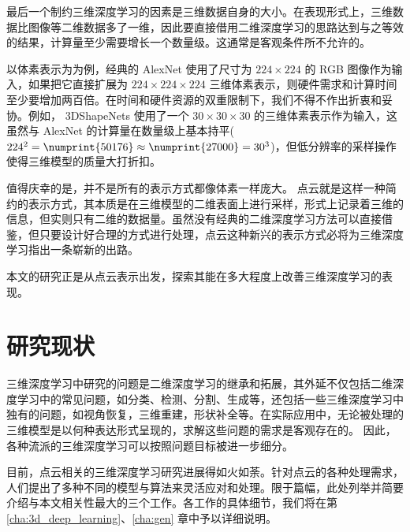 最后一个制约三维深度学习的因素是三维数据自身的大小。在表现形式上，三维数据比图像等二维数据多了一维，因此要直接借用二维深度学习的思路达到与之等效的结果，计算量至少需要增长一个数量级。这通常是客观条件所不允许的。

以体素表示为为例，经典的 AlexNet\cite{alexnet} 使用了尺寸为 $224 \times 224$ 的 RGB 图像作为输入，如果把它直接扩展为 $224 \times 224 \times 224$ 三维体素表示，则硬件需求和计算时间至少要增加两百倍。在时间和硬件资源的双重限制下，我们不得不作出折衷和妥协。例如， 3DShapeNets\cite{3dcnn} 使用了一个 $30 \times 30 \times 30$ 的三维体素表示作为输入，这虽然与 AlexNet 的计算量在数量级上基本持平($224^2 = \numprint{50176} \approx \numprint{27000} = 30^3$)，但低分辨率的采样操作使得三维模型的质量大打折扣。

值得庆幸的是，并不是所有的表示方式都像体素一样庞大。
点云就是这样一种简约的表示方式，其本质是在三维模型的二维表面上进行采样，形式上记录着三维的信息，但实则只有二维的数据量。虽然没有经典的二维深度学习方法可以直接借鉴，但只要设计好合理的方式进行处理，点云这种新兴的表示方式必将为三维深度学习指出一条崭新的出路。

本文的研究正是从点云表示出发，探索其能在多大程度上改善三维深度学习的表现。




\section{研究现状}

三维深度学习中研究的问题是二维深度学习的继承和拓展，其外延不仅包括二维深度学习中的常见问题，如分类\cite{pointnet}、检测\cite{frustumpointnet}、分割\cite{pointnet}、生成\cite{latentpc}等，还包括一些三维深度学习中独有的问题，如视角恢复\cite{rendercnn}，三维重建\cite{pointsetgen}，形状补全\cite{shapecomplete}等。在实际应用中，无论被处理的三维模型是以何种表达形式呈现的，求解这些问题的需求是客观存在的。
因此，各种流派的三维深度学习可以按照问题目标被进一步细分。

目前，点云相关的三维深度学习研究进展得如火如荼。针对点云的各种处理需求，人们提出了多种不同的模型与算法来灵活应对和处理。限于篇幅，此处列举并简要介绍与本文相关性最大的三个工作。各工作的具体细节，我们将在第 \ref{cha:3d_deep_learning}、\ref{cha:gen}  章中予以详细说明。

